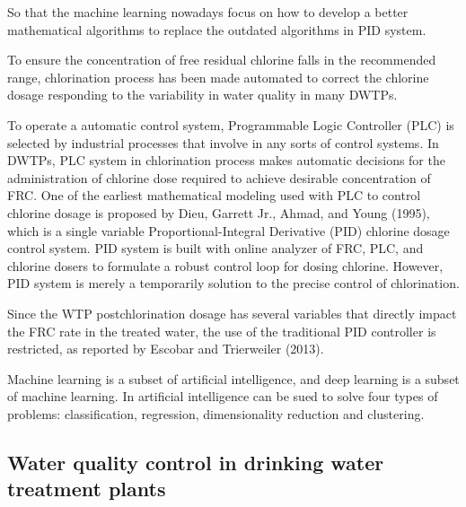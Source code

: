 So that the machine learning nowadays focus on how to develop a better mathematical algorithms to replace the outdated algorithms in PID system.

To ensure the concentration of free residual chlorine falls in the recommended range, chlorination process has been made automated to correct the chlorine dosage responding to the variability in water quality in many DWTPs. 

To operate a automatic control system, Programmable Logic Controller (PLC) is selected by industrial processes that involve in any sorts of control systems. In DWTPs, PLC system in chlorination process makes automatic decisions for the administration of chlorine dose required to achieve desirable concentration of FRC. One of the earliest mathematical modeling used with PLC to control chlorine dosage is proposed by Dieu, Garrett Jr., Ahmad, and Young (1995), which is a single variable Proportional-Integral Derivative (PID) chlorine dosage control system. PID system is built with online analyzer of FRC, PLC, and chlorine dosers to formulate a robust control loop for dosing chlorine. However, PID system is merely a temporarily solution to the precise control of chlorination. 

%

Since the WTP postchlorination dosage has several variables that directly impact the FRC rate in the treated water, the use of the traditional PID controller is restricted, as reported by Escobar and Trierweiler (2013).

Machine learning is a subset of artificial intelligence, and deep learning is a subset 
of machine learning. In artificial intelligence can be sued to solve four types of problems: 
classification, regression, dimensionality reduction and clustering. 
\subsection{Water quality control in drinking water treatment plants}
